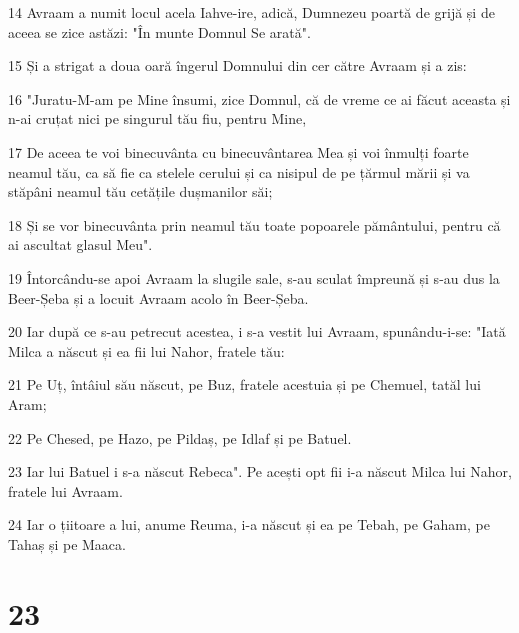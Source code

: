 \par 14 Avraam a numit locul acela Iahve-ire, adică, Dumnezeu poartă de grijă și de aceea se zice astăzi: "În munte Domnul Se arată".
\par 15 Și a strigat a doua oară îngerul Domnului din cer către Avraam și a zis:
\par 16 "Juratu-M-am pe Mine însumi, zice Domnul, că de vreme ce ai făcut aceasta și n-ai cruțat nici pe singurul tău fiu, pentru Mine,
\par 17 De aceea te voi binecuvânta cu binecuvântarea Mea și voi înmulți foarte neamul tău, ca să fie ca stelele cerului și ca nisipul de pe țărmul mării și va stăpâni neamul tău cetățile dușmanilor săi;
\par 18 Și se vor binecuvânta prin neamul tău toate popoarele pământului, pentru că ai ascultat glasul Meu".
\par 19 Întorcându-se apoi Avraam la slugile sale, s-au sculat împreună și s-au dus la Beer-Șeba și a locuit Avraam acolo în Beer-Șeba.
\par 20 Iar după ce s-au petrecut acestea, i s-a vestit lui Avraam, spunându-i-se: "Iată Milca a născut și ea fii lui Nahor, fratele tău:
\par 21 Pe Uț, întâiul său născut, pe Buz, fratele acestuia și pe Chemuel, tatăl lui Aram;
\par 22 Pe Chesed, pe Hazo, pe Pildaș, pe Idlaf și pe Batuel.
\par 23 Iar lui Batuel i s-a născut Rebeca". Pe acești opt fii i-a născut Milca lui Nahor, fratele lui Avraam.
\par 24 Iar o țiitoare a lui, anume Reuma, i-a născut și ea pe Tebah, pe Gaham, pe Tahaș și pe Maaca.

\chapter{23}


